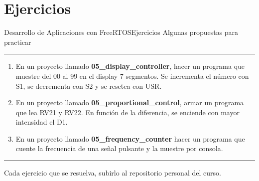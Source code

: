 \documentclass[aspectratio=169, xcolor=dvipsnames]{beamer}
\begin{document}
\section{Ejercicios}
\begin{frame}{Desarrollo de Aplicaciones con FreeRTOS}{Ejercicios}
    Algunas propuestas para practicar
    \noindent\rule{\textwidth}{0.75pt}
    \begin{enumerate}
        \item En un proyecto llamado \textbf{05\_display\_controller}, hacer un programa que muestre del 00 al 99 en el display 7 segmentos. Se incrementa el número con S1, se decrementa con S2 y se resetea con USR.
        \item En un proyecto llamado \textbf{05\_proportional\_control}, armar un programa que lea RV21 y RV22. En función de la diferencia, se enciende con mayor intensidad el D1.
        \item En un proyecto llamado \textbf{05\_frequency\_counter} hacer un programa que cuente la frecuencia de una señal pulsante y la muestre por consola.
    \end{enumerate}
    \noindent\rule{\textwidth}{0.75pt}
    Cada ejercicio que se resuelva, subirlo al repositorio personal del curso.
\end{frame}
\end{document}
